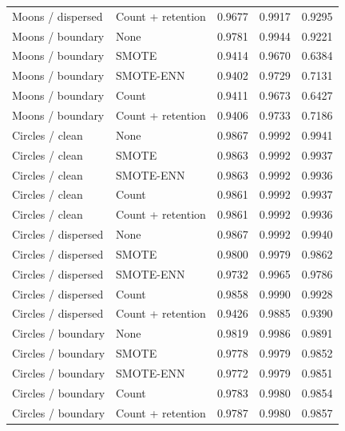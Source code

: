 \begin{table}[htbp]
\begin{tabular}{llrrr}
Moons / dispersed & Count + retention & 0.9677 & 0.9917 & 0.9295 \\
Moons / boundary & None & 0.9781 & 0.9944 & 0.9221 \\
Moons / boundary & SMOTE & 0.9414 & 0.9670 & 0.6384 \\
Moons / boundary & SMOTE-ENN & 0.9402 & 0.9729 & 0.7131 \\
Moons / boundary & Count & 0.9411 & 0.9673 & 0.6427 \\
Moons / boundary & Count + retention & 0.9406 & 0.9733 & 0.7186 \\
Circles / clean & None & 0.9867 & 0.9992 & 0.9941 \\
Circles / clean & SMOTE & 0.9863 & 0.9992 & 0.9937 \\
Circles / clean & SMOTE-ENN & 0.9863 & 0.9992 & 0.9936 \\
Circles / clean & Count & 0.9861 & 0.9992 & 0.9937 \\
Circles / clean & Count + retention & 0.9861 & 0.9992 & 0.9936 \\
Circles / dispersed & None & 0.9867 & 0.9992 & 0.9940 \\
Circles / dispersed & SMOTE & 0.9800 & 0.9979 & 0.9862 \\
Circles / dispersed & SMOTE-ENN & 0.9732 & 0.9965 & 0.9786 \\
Circles / dispersed & Count & 0.9858 & 0.9990 & 0.9928 \\
Circles / dispersed & Count + retention & 0.9426 & 0.9885 & 0.9390 \\
Circles / boundary & None & 0.9819 & 0.9986 & 0.9891 \\
Circles / boundary & SMOTE & 0.9778 & 0.9979 & 0.9852 \\
Circles / boundary & SMOTE-ENN & 0.9772 & 0.9979 & 0.9851 \\
Circles / boundary & Count & 0.9783 & 0.9980 & 0.9854 \\
Circles / boundary & Count + retention & 0.9787 & 0.9980 & 0.9857 \\
\hline
\end{tabular}
\end{table}
\clearpage
